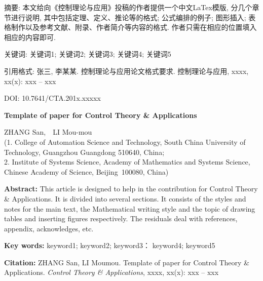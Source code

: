 \maketitle
\setlength{\oddsidemargin}{ 1cm}  %
\setlength{\textwidth}{15.5cm} \vspace{-1.2cm}
\begin{center}
\parbox{\textwidth}{\setlength{\parindent}{1em}
{\footnotesize { 摘要:}
本文给向《控制理论与应用》投稿的作者提供一个中文LaTex模版,
分几个章节进行说明, 其中包括定理、\!\!定义、\!\!推论等的格式;
公式编排的例子; 图形插入;
表格制作以及参考文献、\!\!附录、\!\!作者简介等内容的格式.
作者只需在相应的位置填入相应的内容即可.

{ 关键词:} 关键词1; 关键词2; 关键词3; 关键词4;
关键词5

{引用格式:} 张三, 李某某. 控制理论与应用论文格式要求. 控制理论与应用, xxxx, xx(x): xxx -- xxx\\\vspace*{-16pt}

DOI: 10.7641/CTA.201x.xxxxx
}}
\end{center}
\vspace{.1cm}
\begin{center}
\parbox{\textwidth}{\setlength{\parindent}{1em}
{\centering\Large\textbf{Template of paper for Control Theory \&
Applications\\}} \vspace{-1.2mm}
\begin{center}
ZHANG San\makebox{$^{\dag}$},~~LI Mou-mou\\[2pt]
\scriptsize{(1. College of Automation Science and Technology, South
China University of Technology, Guangzhou Guangdong 510640, China;\\
2. Institute of Systems Science, Academy of Mathematics and Systems
Science, Chinese Academy of Science, Beijing~100080, China)}
\end{center}

\vspace{-10pt}\footnotesize{\textbf{Abstract:} This article is
designed to
 help in the contribution for
 Control Theory \& Applications. It is divided into several
sections. It consists of the styles and notes for the main text, the
Mathematical writing style and
 the topic of drawing tables and inserting figures
respectively. The residuals deal with references, appendix,
acknowledges, etc.

\textbf{Key words:} keyword1; keyword2; keyword3： keyword4; keyword5

\textbf{Citation:} ZHANG San, LI Moumou. Template of paper for Control Theory \&
Applications. {\it Control Theory \& Applications}, xxxx, xx(x): xxx -- xxx}}
\end{center}

